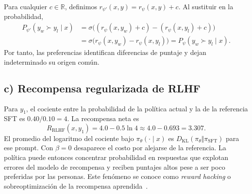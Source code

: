 Para cualquier $c\in\mathbb{R}$, definimos $r_{\psi'}(x,y)=r_\psi(x,y)+c$.
Al sustituir en la probabilidad,
\begin{align*}
    P_{\psi'}(y_w\succ y_l\mid x)
    &=\sigma\bigl((r_\psi(x,y_w)+c)-(r_\psi(x,y_l)+c)\bigr)\\
    &=\sigma\bigl(r_\psi(x,y_w)-r_\psi(x,y_l)\bigr)
    =P_\psi(y_w\succ y_l\mid x).
\end{align*}
Por tanto, las preferencias identifican diferencias de puntaje y dejan
indeterminado su origen común.

\subsection*{c) Recompensa regularizada de RLHF}

Para $y_1$, el cociente entre la probabilidad de la política actual y
la de la referencia SFT es $0.40/0.10=4$. La recompensa neta es
\[
    R_{\mathrm{RLHF}}(x,y_1)
    =4.0-0.5\ln 4
    \approx 4.0-0.693
    =\boxed{3.307}.
\]
El promedio del logaritmo del cociente bajo $\pi_\theta(\cdot\mid x)$
es $D_{\mathrm{KL}}(\pi_\theta\Vert\pi_{\mathrm{SFT}})$ para ese prompt.
Con $\beta=0$ desaparece el
costo por alejarse de la referencia. La política puede entonces
concentrar probabilidad en respuestas que explotan errores del modelo
de recompensa y reciben puntajes altos pese a ser poco preferidas por
las personas. Este fenómeno se conoce como \emph{reward hacking} o
sobreoptimización de la recompensa aprendida~\cite{ouyang2022}.
